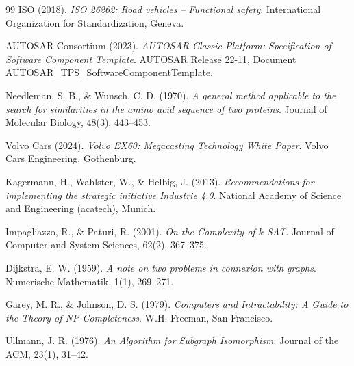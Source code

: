 ﻿\documentclass[a4paper,12pt]{article}
\theoremstyle{definition}
\begin{document}
\begin{thebibliography}{99}
ISO (2018).
\textit{ISO 26262: Road vehicles -- Functional safety}.
International Organization for Standardization, Geneva.

AUTOSAR Consortium (2023).
\textit{AUTOSAR Classic Platform: Specification of Software Component Template}.
AUTOSAR Release 22-11, Document AUTOSAR\_TPS\_SoftwareComponentTemplate.

Needleman, S. B., \& Wunsch, C. D. (1970).
\textit{A general method applicable to the search for similarities in the amino acid sequence of two proteins}.
Journal of Molecular Biology, 48(3), 443--453.

Volvo Cars (2024).
\textit{Volvo EX60: Megacasting Technology White Paper}.
Volvo Cars Engineering, Gothenburg.

Kagermann, H., Wahlster, W., \& Helbig, J. (2013).
\textit{Recommendations for implementing the strategic initiative Industrie 4.0}.
National Academy of Science and Engineering (acatech), Munich.

Impagliazzo, R., \& Paturi, R. (2001).
\textit{On the Complexity of $k$-SAT}.
Journal of Computer and System Sciences, 62(2), 367--375.

Dijkstra, E. W. (1959).
\textit{A note on two problems in connexion with graphs}.
Numerische Mathematik, 1(1), 269--271.

Garey, M. R., \& Johnson, D. S. (1979).
\textit{Computers and Intractability: A Guide to the Theory of NP-Completeness}.
W.H. Freeman, San Francisco.

Ullmann, J. R. (1976).
\textit{An Algorithm for Subgraph Isomorphism}.
Journal of the ACM, 23(1), 31--42.

\end{thebibliography}
\end{document}
